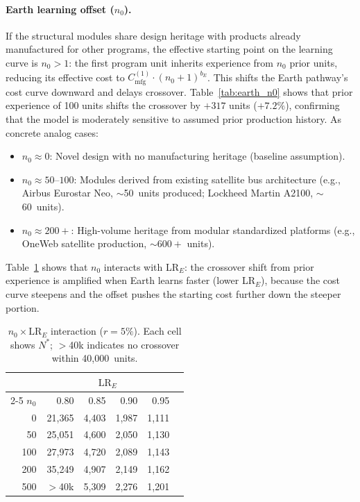 \documentclass[preprint,12pt]{elsarticle}
\begin{document}
\paragraph{Earth learning offset ($n_0$).} If the structural modules share design heritage with products already manufactured for other programs, the effective starting point on the learning curve is $n_0 > 1$: the first program unit inherits experience from $n_0$ prior units, reducing its effective cost to $C_{\mathrm{mfg}}^{(1)} \cdot (n_0 + 1)^{b_E}$. This shifts the Earth pathway's cost curve downward and delays crossover. Table~\ref{tab:earth_n0} shows that prior experience of 100 units shifts the crossover by $+317$ units ($+7.2\%$), confirming that the model is moderately sensitive to assumed prior production history. As concrete analog cases:
\begin{itemize}
\item $n_0 \approx 0$: Novel design with no manufacturing heritage (baseline assumption).
\item $n_0 \approx 50$--$100$: Modules derived from existing satellite bus architecture (e.g., Airbus Eurostar Neo, $\sim$50~units produced; Lockheed Martin A2100, $\sim$60~units).
\item $n_0 \approx 200{+}$: High-volume heritage from modular standardized platforms (e.g., OneWeb satellite production, ${\sim}600{+}$ units).
\end{itemize}
Table~\ref{tab:n0_lr_interaction} shows that $n_0$ interacts with LR$_E$: the crossover shift from prior experience is amplified when Earth learns faster (lower LR$_E$), because the cost curve steepens and the offset pushes the starting cost further down the steeper portion.

\begin{table}[htbp]
\centering
\caption{$n_0 \times \mathrm{LR}_E$ interaction ($r = 5\%$). Each cell shows $N^*$; $>$40k indicates no crossover within 40{,}000~units.}
\label{tab:n0_lr_interaction}
\small
\begin{tabular}{@{}rrrrrr@{}}
\toprule
 & \multicolumn{4}{c}{$\mathrm{LR}_E$} \\
\cmidrule(l){2-5}
$n_0$ & 0.80 & 0.85 & 0.90 & 0.95 \\
\midrule
0   & 21{,}365 & 4{,}403 & 1{,}987 & 1{,}111 \\
50  & 25{,}051 & 4{,}600 & 2{,}050 & 1{,}130 \\
100 & 27{,}973 & 4{,}720 & 2{,}089 & 1{,}143 \\
200 & 35{,}249 & 4{,}907 & 2{,}149 & 1{,}162 \\
500 & $>$40k   & 5{,}309 & 2{,}276 & 1{,}201 \\
\bottomrule
\end{tabular}
\end{table}
\end{document}
